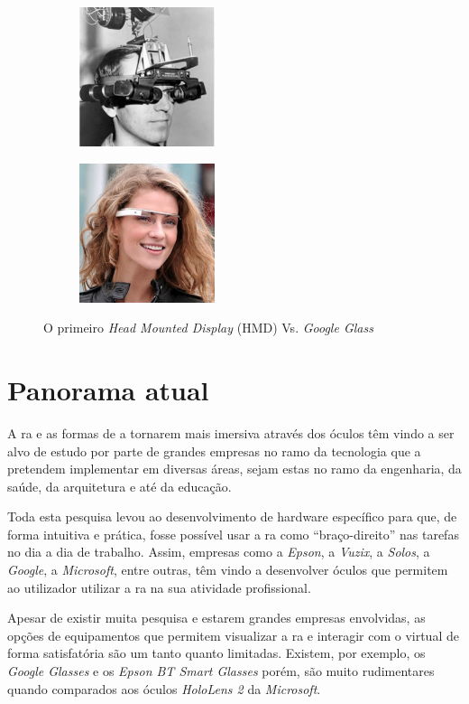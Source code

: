 \documentclass{report}
\begin{document}
\begin{figure}[H]
    \centering
    \begin{subfigure}{.5\textwidth}
      \centering
      \includegraphics[height=11em]{firsthmd.jpg}
      \label{Fig:hmd}
    \end{subfigure}%
    \begin{subfigure}{.5\textwidth}
      \centering
      \includegraphics[height=11em]{googleglass.jpg}
      \label{Fig:googleglass}
    \end{subfigure}
    \caption{O primeiro \textit{Head Mounted Display} (HMD) Vs. \textit{Google Glass}}
    \label{Fig:oculos}
\end{figure}

\section{Panorama atual}
A \ac{ra} e as formas de a tornarem mais imersiva através dos óculos têm vindo a ser alvo de estudo por parte de grandes empresas no ramo da tecnologia que a pretendem implementar em diversas áreas, sejam estas no ramo da engenharia, da saúde, da arquitetura e até da educação.

Toda esta pesquisa levou ao desenvolvimento de hardware específico para que, de forma intuitiva e prática, fosse possível usar a \ac{ra} como “braço-direito” nas tarefas no dia a dia de trabalho. Assim, empresas como a \textit{Epson}, a \textit{Vuzix}, a \textit{Solos}, a \textit{Google}, a \textit{Microsoft}, entre outras, têm vindo a desenvolver óculos que permitem ao utilizador utilizar a \ac{ra} na sua atividade profissional.

Apesar de existir muita pesquisa e estarem grandes empresas envolvidas, as opções de equipamentos que permitem visualizar a \ac{ra} e interagir com o virtual de forma satisfatória são um tanto quanto limitadas. Existem, por exemplo, os \textit{Google Glasses} e os \textit{Epson BT Smart Glasses} porém, são muito rudimentares quando comparados aos óculos \textit{HoloLens 2} da \textit{Microsoft}.
\end{document}

